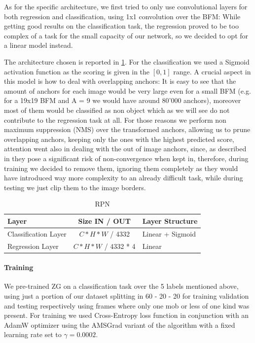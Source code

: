 \documentclass[10pt,journal,cspaper,compsoc]{IEEEtran}
\begin{document}
     As for the specific architecture, we first tried to only use convolutional layers for both regression and classification, using 1x1 convolution over the BFM: While getting good results on the classification task, the regression proved to be too complex of a task for the small capacity of our network, so we decided to opt for a linear model instead. 

The architecture chosen is reported in \ref*{tab:Table 2}. For the classification we used a Sigmoid activation function as the scoring is given in the $[0, 1]$ range.  A crucial aspect in this model is how to deal with overlapping anchors: It is easy to see that the amount of anchors for each image would be very large even for a small BFM (e.g. for a 19x19 BFM and A = 9 we would have around 80'000 anchors), moreover most of them would be classified as non object which as we will see do not contribute to the regression task at all. For those reasons we perform non maximum suppression (NMS) over the transformed anchors, allowing us to prune overlapping anchors, keeping only the ones with the highest predicted score, attention went also in dealing with the out of image anchors, since, as described in \cite{arxiv:FasterRCNN} they pose a significant risk of non-convergence when kept in, therefore, during training we decided to remove them, ignoring them completely as they would have introduced way more complexity to an already difficult task, while during testing we just clip them to the image borders.

    \begin{table}[htb]
        \caption{RPN}
        \label{tab:Table 2}
        \begin{tabularx}{.5\textwidth}{l | c |  l}  
            \textbf{Layer} & \textbf{Size IN / OUT} & \textbf{Layer Structure}\\
            \hline 
            Classification Layer &  $ C * H * W$ / 4332        & Linear + Sigmoid \\ 
            Regression Layer    &  $ C * H * W$ / 4332 * 4  & Linear \\
        \end{tabularx}
    \end{table}
    
    \paragraph*{Training}%
	    We pre-trained ZG on a classification task over the 5 labels mentioned above,  using just a portion of our dataset splitting in 60 - 20 - 20 for training validation and testing respectively using frames where only one mob or less of one kind was present. For training we used Cross-Entropy loss function in conjunction with an AdamW optimizer using the AMSGrad variant of the algorithm with a fixed learning rate set to $\gamma = 0.0002$.
\end{document}
